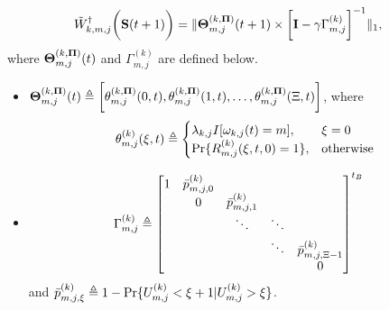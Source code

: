 \begin{lemma}
    \label{lemma:w_ap}
    \begin{align}
        &\tilde{W}^{\dagger}_{k,m,j}\bigg(\mathbf{S}(t+1)\bigg) =
        \lVert
            \boldsymbol{\Theta}^{(k, \boldsymbol{\Pi})}_{m,j}(t+1) \times
            \bigg[
                \mathbf{I} - \gamma \Gamma^{(k)}_{m,j}
            \bigg]^{-1}
        \|_1,
        \label{w_ap}
    \end{align}
    where $\boldsymbol{\Theta}^{(k, \boldsymbol{\Pi})}_{m,j}(t)$ and $\Gamma^{(k)}_{m,j}$ are defined below.
    \begin{itemize}
        \item {$\boldsymbol{\Theta}^{(k,\boldsymbol{\Pi})}_{m,j}(t) \triangleq \bigg[
            \theta^{(k,\boldsymbol{\Pi})}_{m,j}(0,t),
            \theta^{(k,\boldsymbol{\Pi})}_{m,j}(1,t),
            \dots,
            \theta^{(k,\boldsymbol{\Pi})}_{m,j}(\Xi,t)
            \bigg]$},
        where 
        \begin{align}
            \theta^{(k)}_{m,j}(\xi,t) \triangleq 
            \begin{cases}
                \lambda_{k,j} I[\omega_{k,j}(t)=m], & \xi=0
                \\
                \Pr\{R^{(k)}_{m,j}(\xi,t,0) = 1\}, & \text{otherwise}
            \end{cases}
        \end{align}
        \item
        \begin{align}
            \Gamma^{(k)}_{m,j} &\triangleq
            \begin{bmatrix}
                1 & \bar{p}^{(k)}_{m,j,0} &                       &        &                           \\
                  & 0                     & \bar{p}^{(k)}_{m,j,1} &        &                           \\
                  &                       & \ddots                & \ddots &                           \\
                  &                       &                       & \ddots & \bar{p}^{(k)}_{m,j,\Xi-1} \\
                  &                       &                       &        & 0                         \\
            \end{bmatrix}^{t_B}
            \label{eqn:gamma}
        \end{align}
        and $\bar{p}^{(k)}_{m,j,\xi} \triangleq 1 - \Pr\{U^{(k)}_{m,j} < \xi+1 | U^{(k)}_{m,j}>\xi\}$.
    \end{itemize}
\end{lemma}
